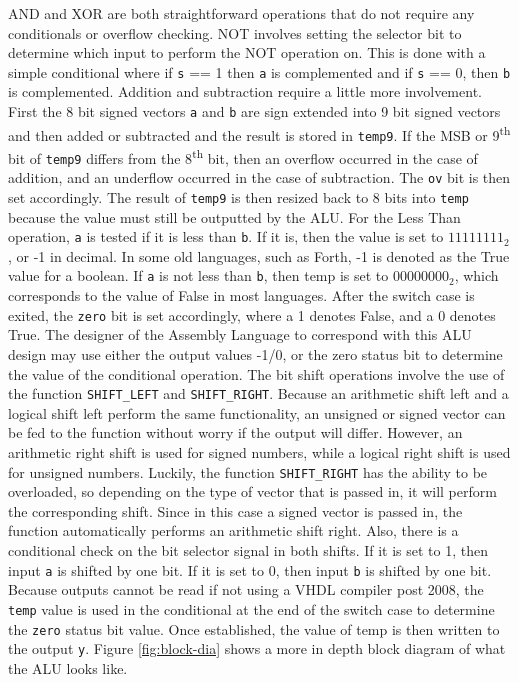 \documentclass[12pt]{article}
\begin{document}
\noindent AND and XOR are both straightforward operations that do not require any conditionals or overflow checking. NOT involves setting the selector bit to determine which input to perform the NOT operation on. This is done with a simple conditional where if \texttt{s} == 1 then \texttt{a} is complemented and if \texttt{s} == 0, then \texttt{b} is complemented. Addition and subtraction require a little more involvement. First the 8 bit signed vectors \texttt{a} and \texttt{b} are sign extended into 9 bit signed vectors and then added or subtracted and the result is stored in \texttt{temp9}. If the MSB or 9\textsuperscript{th} bit of \texttt{temp9} differs from the 8\textsuperscript{th} bit, then an overflow occurred in the case of addition, and an underflow occurred in the case of subtraction. The \texttt{ov} bit is then set accordingly. The result of \texttt{temp9} is then resized back to 8 bits into \texttt{temp} because the value must still be outputted by the ALU. For the Less Than operation, \texttt{a} is tested if it is less than \texttt{b}. If it is, then the value is set to $11111111_2$, or -1 in decimal. In some old languages, such as Forth, -1 is denoted as the True value for a boolean. If \texttt{a} is not less than \texttt{b}, then temp is set to $00000000_2$, which corresponds to the value of False in most languages. After the switch case is exited, the \texttt{zero} bit is set accordingly, where a 1 denotes False, and a 0 denotes True. The designer of the Assembly Language to correspond with this ALU design may use either the output values -1/0, or the zero status bit to determine the value of the conditional operation. The bit shift operations involve the use of the function \texttt{SHIFT\_LEFT} and \texttt{SHIFT\_RIGHT}. Because an arithmetic shift left and a logical shift left perform the same functionality, an unsigned or signed vector can be fed to the function without worry if the output will differ. However, an arithmetic right shift is used for signed numbers, while a logical right shift is used for unsigned numbers. Luckily, the function \texttt{SHIFT\_RIGHT} has the ability to be overloaded, so depending on the type of vector that is passed in, it will perform the corresponding shift. Since in this case a signed vector is passed in, the function automatically performs an arithmetic shift right. Also, there is a conditional check on the bit selector signal in both shifts. If it is set to 1, then input \texttt{a} is shifted by one bit. If it is set to 0, then input \texttt{b} is shifted by one bit. Because outputs cannot be read if not using a VHDL compiler post 2008, the \texttt{temp} value is used in the conditional at the end of the switch case to determine the \texttt{zero} status bit value. Once established, the value of temp is then written to the output \texttt{y}. Figure \ref{fig:block-dia} shows a more in depth block diagram of what the ALU looks like.
\end{document}
